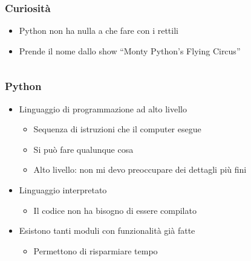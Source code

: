 
\begin{exampleframe}
    \frametitle{Curiosità}

    \begin{itemize}
        \item Python non ha nulla a che fare con i rettili
        \item Prende il nome dallo show ``Monty Python's Flying Circus''
    \end{itemize}

    \bigskip
    \begin{columns}
        \centering
        
        \centering
    \end{columns}
\end{exampleframe}

\begin{contentframe}
    \frametitle{Python}

    \begin{itemize}
        \item Linguaggio di programmazione ad alto livello
        \begin{itemize}
            \item Sequenza di istruzioni che il computer esegue
            \item Si può fare qualunque cosa
            \item Alto livello: non mi devo preoccupare dei dettagli più fini
        \end{itemize}
        
        \bigskip
        \item Linguaggio interpretato
        \begin{itemize}
            \item Il codice non ha bisogno di essere compilato
        \end{itemize}

        \bigskip
        \item Esistono tanti moduli con funzionalità già fatte
        \begin{itemize}
            \item Permettono di risparmiare tempo
        \end{itemize}
    \end{itemize}
\end{contentframe}

